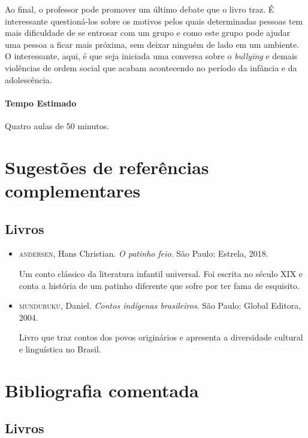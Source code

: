 \documentclass[11pt]{extarticle}
\begin{document}
Ao final, o professor pode promover um último debate que o livro traz. É interessante questioná-los sobre os motivos pelos quais determinadas pessoas tem mais dificuldade de se entrosar com um grupo e como este grupo pode ajudar uma pessoa a ficar mais próxima, sem deixar ninguém de lado em um ambiente. O interessante, aqui, é que seja iniciada uma conversa sobre o \textit{bullying} e demais violências de ordem social que acabam acontecendo no período da infância e da adolescência. 

\paragraph{Tempo Estimado} Quatro aulas de 50 minutos.



\section{Sugestões de referências complementares}

\subsection{Livros} 

\begin{itemize}
\item \textsc{andersen}, Hans Christian. \textit{O patinho feio}. São Paulo: Estrela, 2018.

Um conto clássico da literatura infantil universal. Foi escrita no século XIX e conta a história de um patinho diferente que sofre por ter fama de esquisito. 

\item \textsc{munduruku}, Daniel. \textit{Contos indígenas brasileiros}. São Paulo: Global Editora, 2004.

Livro que traz contos dos povos originários e apresenta a diversidade cultural e linguística no Brasil.
\end{itemize}

\section{Bibliografia comentada}
\subsection{Livros}
\end{document}
